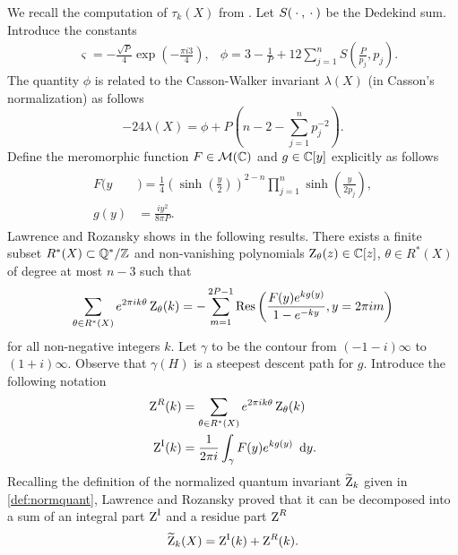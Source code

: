 We recall the computation of $\tau_k(X)$ from \cite{LawrenceRozansky}. Let $S({}\cdot{},{}\cdot{})$ be the Dedekind sum. Introduce the constants \begin{align} \label{eq:constants} & \varsigma  =-\frac{\sqrt{P}}{4} \exp\left(-\frac{\pi i3 }{4}\right), & \phi =3-\frac{1}{P}+12\sum_{j=1}^n S\left(\frac{P}{p_j},p_j\right). \end{align} The quantity $\phi$ is related to the Casson-Walker invariant $\lambda(X)$ \cite{Walker92} (in Casson's normalization) as follows
$$-24 \lambda(X)=\phi+P\left( n-2-\sum_{j=1}^n p_j^{-2}\right).
$$ Define the meromorphic function $F\in \mathcal{M}(\mathbb{C})$ and $g \in \mathbb{C}[y]$  explicitly as  follows
\begin{align}  \label{def:F} \begin{split} F(y&)=\frac{1}{4}\left(\sinh\left(\frac{y}{2}\right)\right)^{2-n} \prod_{j=1}^n \sinh\left(\frac{y}{2p_j}\right), 
\\  g(y)&=\frac{iy^2}{8\pi P}. \end{split}
\end{align}  
     Lawrence and Rozansky shows in \cite{LawrenceRozansky} the following results. There exists a finite subset $R^*(X) \subset \mathbb{Q}^* / \mathbb{Z}$ and non-vanishing polynomials $\operatorname{Z}_{\theta}(z) \in \mathbb{C}[z]$, $\theta \in R^*(X)$ of degree at most $n-3$ such that
\begin{equation} \label{Polypoly}
\sum_{\theta \in R^*(X)} e^{2 \pi i k \theta}\operatorname{Z}_{\theta}(k) = - \sum_{m=1}^{2 P-1} \text{Res} \left( \frac{F(y)e^{kg(y)}}{1-e^{-ky}}, y=2\pi i m \right)
\end{equation}
for all non-negative integers $k$. Let $\gamma$ to be the contour from $(-1-i)\infty$  to $(1+i)\infty$.
Observe that $\gamma(H)$ is a steepest descent path for $g.$
Introduce the following notation
\begin{align} \label{eq:integralresiduedecomp} \begin{split}
\operatorname{Z}^R(k) &= \sum_{\theta \in R^*(X)} e^{2 \pi i k \theta}\operatorname{Z}_{\theta}(k)
\\ \operatorname{Z}^{\operatorname{I}}(k) &= \frac{1}{2\pi i} \int_{\gamma} F(y)e^{kg(y)} \ \operatorname{{d}\hskip-.6mm} y. \end{split}
\end{align}
Recalling the definition of the normalized quantum invariant $\widetilde{\operatorname{Z}}_k$ given in \eqref{def:normquant}, Lawrence and Rozansky proved that it can be decomposed into a sum of an integral part $\operatorname{Z}^{\operatorname{I}}$ and a residue part $\operatorname{Z}^R$
\begin{equation}
\label{phasedecomp}
\widetilde{\operatorname{Z}} _k(X)= \operatorname{Z}^{\operatorname{I}}(k)+\operatorname{Z}^R(k).
\end{equation}
